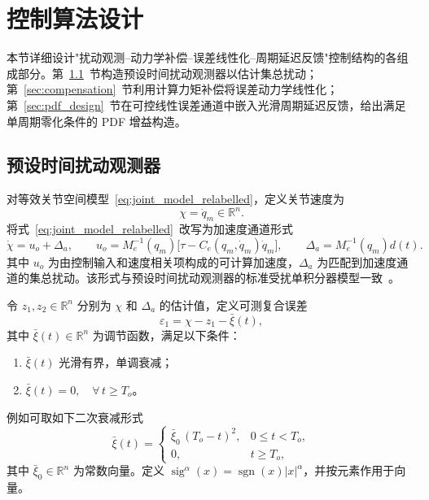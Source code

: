 \section{控制算法设计}
\label{sec:controller}

本节详细设计"扰动观测--动力学补偿--误差线性化--周期延迟反馈"控制结构的各组成部分。第~\ref{sec:ptdo}~节构造预设时间扰动观测器以估计集总扰动；第~\ref{sec:compensation}~节利用计算力矩补偿将误差动力学线性化；第~\ref{sec:pdf_design}~节在可控线性误差通道中嵌入光滑周期延迟反馈，给出满足单周期零化条件的 PDF 增益构造。

\subsection{预设时间扰动观测器}
\label{sec:ptdo}

对等效关节空间模型~\eqref{eq:joint_model_relabelled}，定义关节速度为
\[
\chi = \dot q_m \in\mathbb R^n.
\]
将式~\eqref{eq:joint_model_relabelled}~改写为加速度通道形式
\begin{equation}
\dot\chi = u_o + \Delta_a,\qquad
u_o = M_e^{-1}(q_m)\bigl[\tau - C_e(q_m,\dot q_m)\dot q_m\bigr],\qquad
\Delta_a = M_e^{-1}(q_m)d(t).
\label{eq:observer_channel}
\end{equation}
其中 \(u_o\) 为由控制输入和速度相关项构成的可计算加速度，\(\Delta_a\) 为匹配到加速度通道的集总扰动。该形式与预设时间扰动观测器的标准受扰单积分器模型一致~\cite{jiangPrescribedtimeDisturbanceObserver2024}。

\noindent 令 \(z_1,z_2\in\mathbb R^n\) 分别为 \(\chi\) 和 \(\Delta_a\) 的估计值，定义可测复合误差
\begin{equation}
\varepsilon_1 = \chi - z_1 - \bar\xi(t),
\label{eq:observer_error}
\end{equation}
其中 \(\bar\xi(t)\in\mathbb R^n\) 为调节函数，满足以下条件：

\begin{enumerate}
  \item \(\bar\xi(t)\) 光滑有界，单调衰减；
  \item \(\bar\xi(t)=0,\quad \forall\,t\ge T_o\)。
\end{enumerate}

例如可取如下二次衰减形式
\[
\bar\xi(t) = 
\begin{cases}
\bar\xi_0\,(T_o-t)^2, & 0\le t<T_o,\\
0, & t\ge T_o,
\end{cases}
\]
其中 \(\bar\xi_0\in\mathbb R^n\) 为常数向量。定义 \(\operatorname{sig}^{\alpha}(x)=\operatorname{sgn}(x)|x|^\alpha\)，并按元素作用于向量。

